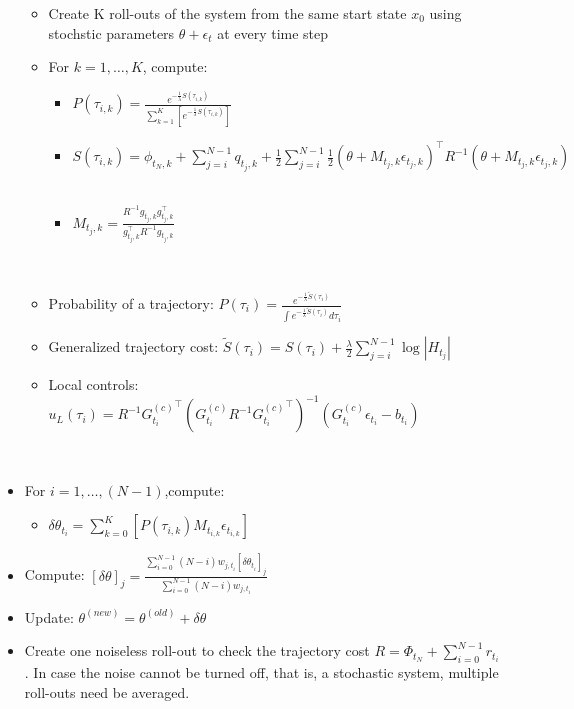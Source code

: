 \documentclass[journal]{IEEEtran}
\begin{document}
\begin{table}
\begin{itemize}
\begin{itemize}
         \item Create K roll-outs of the system from the same start state $x_0$ using stochstic parameters
         $\theta+ \epsilon_t$ at every time step
         \ \\
         \item For $k = 1 , \ldots,  K$, compute:
         \ \\
         \begin{itemize}
          \item 
              $P(\tau_{i,k}) = \frac{e^{-\frac{1}{\lambda}S(\tau_{i,k})}}{\sum_{k=1}^{K} [e^{-\frac{1}{\lambda}S(\tau_{i,k})}]}  $
          \ \\
          \item $S(\tau_{i,k}) = \phi_{t_N,k}+\sum_{j=i}^{N-1}q_{t_j,k}   + \frac{1}{2}\sum_{j=i}^{N-1}  \frac{1}{2}(\theta + M_{t_j,k}\epsilon_{t_j,k})^{\top}{R}^{-1} (\theta + M_{t_j,k}\epsilon_{t_j,k})$
          \ \\
          \item $M_{t_j, k} = \frac{R^{-1}g_{t_j, k}g_{t_j, k}^{\top}}{g_{t_j, k}^{\top}R^{-1}g_{t_j, k}}$
         \end{itemize}
         \ \\
         \item Probability of a trajectory: $P(\tau_i) = \frac{e^{-\frac{1}{\lambda}\tilde{S}(\tau_i)}  }{\int e^{-\frac{1}{\lambda}\tilde{S}(\tau_i)}d\tau_i}$ 
         \ \\
         \item Generalized trajectory cost: $\tilde{S}(\tau_i) = S(\tau_i) + \frac{\lambda}{2} \sum_{j = i}^{N-1} \log |H_{t_j}|$
          \ \\
         \item Local controls: $u_L(\tau_i) = R^{-1} {G_{t_i}^{(c)}}^{\top} ({G_{t_i}^{(c)}} R^{-1} {G_{t_i}^{(c)}}^{\top})^{-1}(G_{t_i}^{(c)}\epsilon_{t_i} - b_{t_i})$
       \end{itemize} 
       \ \\
       \item For $i=1, \ldots, (N-1)$,compute:
       \ \\ 
       \begin{itemize}
        \item  $\delta \theta_{t_i}  = \sum_{k=0}^{K}[ P(\tau_{i,k}) M_{t_{i,k}} \epsilon_{t_{i,k}}  ]$
        \ \\ 
       \end{itemize}
       \item Compute: $[\delta \theta ]_j =  \frac{\sum_{ i= 0}^{N-1}(N-i)w_{j, t_i}[\delta \theta_{t_i}]_j}{\sum_{ i= 0}^{N-1}(N-i)w_{j, t_i}}$
       \ \\
       \item Update: $ \theta^{(new)}  = \theta^{(old)} + \delta \theta$
       \ \\
       \item Create one noiseless roll-out to check the trajectory cost $R = \Phi_{t_N} +\sum_{i = 0}^{N -1} r_{t_i}$ . In case
       the noise cannot be turned off, that is, a stochastic system, multiple roll-outs need be averaged.
     \end{itemize}
   

\end{table}
\end{document}
